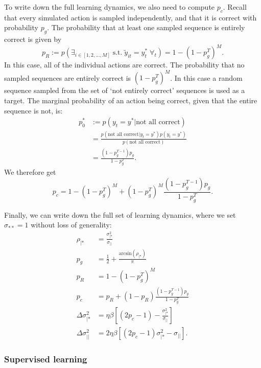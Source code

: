 \documentclass{article}
\begin{document}
To write down the full learning dynamics, we also need to compute $p_c$.
Recall that every simulated action is sampled independently, and that it is correct with probability $p_g$.
The probability that at least one sampled sequence is entirely correct is given by
\begin{equation}
    p_R := p( \exists_{i \in [1, 2, \ldots, M]} \; \text{s.t.} \; \tilde{y}_{it} = {y_t^*} \; \forall_t) = 1 - (1 - p_g^T)^M.
\end{equation}
In this case, all of the individual actions are correct.
The probability that no sampled sequences are entirely correct is $(1 - p_g^T)^M$.
In this case a random sequence sampled from the set of `not entirely correct' sequences is used as a target.
The marginal probability of an action being correct, given that the entire sequence is not, is:
\begin{align}
    p_0^* &:= p(y_t = y^* | \text{not all correct})\\
    &= \frac{p(\text{not all correct}| y_t = y^*) p(y_t = y^*)}{p(\text{not all correct})}\\
    &= \frac{(1 - p_g^{T-1}) p_g}{1 - p_g^T}.
\end{align}
We therefore get
\begin{equation}
    \label{eq:pc}
    p_c = 1 - (1 - p_g^T)^M + (1 - p_g^T)^M \frac{(1 - p_g^{T-1}) p_g}{1 - p_g^T}.
\end{equation}

Finally, we can write down the full set of learning dynamics, where we set $\sigma_{**} = 1$ without loss of generality:
\begin{align}
    \rho_{|*} &= \frac{\sigma_{|*}^2}{\sigma_{||}}\\
    p_g &= \frac{1}{2} + \frac{\text{arcsin}(\rho_{|*})}{\pi}\\
    p_R &= 1 - (1 - p_g^T)^M\\
    p_c &= p_R + (1-p_R) \frac{(1 - p_g^{T-1}) p_g}{1 - p_g^T}\\
    \Delta \sigma_{|*}^2 &= \eta \beta \left [  (2 p_c - 1) - \frac{\sigma_{|*}^2}{\sigma_{||}} \right ]\\
    \Delta \sigma_{||}^2 &= 2 \eta \beta \left [  (2 p_c - 1) \sigma_{|*}^2 - \sigma_{||} \right ].
\end{align}

\subsubsection*{Supervised learning}
\end{document}
